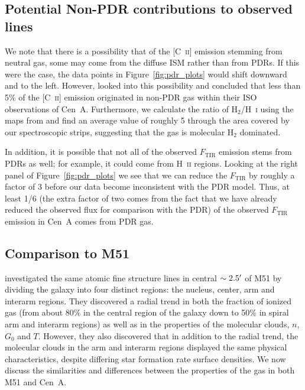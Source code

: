 \subsection{Potential Non-PDR contributions to observed lines}
We note that there is a possibility that of the [C~\textsc{ii}] emission stemming from neutral gas, some may come from the diffuse ISM rather than from PDRs.  If this were the case, the data points in Figure~\ref{fig:pdr_plots} would shift downward and to the left.  However, \citet{2000A&A...355..885U} looked into this possibility and concluded that less than 5\% of the [C~\textsc{ii}] emission originated in non-PDR gas within their ISO observations of Cen~A.  Furthermore, we calculate the ratio of H$_{2}$/H~\textsc{i} using the maps from \citet{2012MNRAS.422.2291P} and find an average value of roughly 5 through the area covered by our spectroscopic strips, suggesting that the gas is molecular H$_{2}$ dominated.

In addition, it is possible that not all of the observed $F_{\mathrm{TIR}}$ emission stems from PDRs as well; for example, it could come from H~\textsc{ii} regions.  Looking at the right panel of Figure~\ref{fig:pdr_plots} we see that we can reduce the $F_{\mathrm{TIR}}$ by roughly a factor of 3 before our data become inconsistent with the PDR model.  Thus, at least 1/6 (the extra factor of two comes from the fact that we have already reduced the observed flux for comparison with the PDR) of the observed $F_{\mathrm{TIR}}$ emission in Cen~A comes from PDR gas.

\subsection{Comparison to M51}\label{compare_m51}
\citet{parkin_2013} investigated the same atomic fine structure lines in central $\sim2.5\mbox{$^\prime$}$ of M51 by dividing the galaxy into four distinct regions: the nucleus, center, arm and interarm regions.  They discovered a radial trend in both the fraction of ionized gas (from about 80\% in the central region of the galaxy down to 50\% in spiral arm and interarm regions) as well as in the properties of the molecular clouds, $n$, $G_{0}$ and $T$.  However, they also discovered that in addition to the radial trend, the molecular clouds in the arm and interarm regions displayed the same physical characteristics, despite differing star formation rate surface densities.  We now discuss the similarities and differences between the properties of the gas in both M51 and Cen~A.

